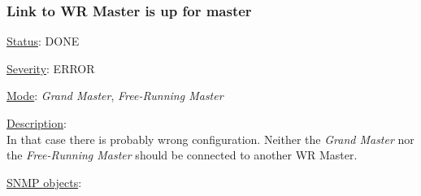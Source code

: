 \subsubsection{\bf Link to WR Master is up for master}
		\label{fail:timing:master_up}
		\begin{pck_descr}
			\item [] \underline{Status}: DONE
			\item [] \underline{Severity}: ERROR
			\item [] \underline{Mode}: \emph{Grand Master}, \emph{Free-Running Master}
			\item [] \underline{Description}:\\
				In that case there is probably wrong configuration. Neither the
				\emph{Grand Master} nor the \emph{Free-Running Master} should be
				connected to another WR Master.
			\item [] \underline{SNMP objects}:\\
				\\
				\\
				\\
				\\
		\end{pck_descr}

